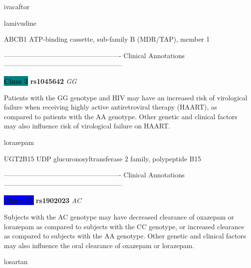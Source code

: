 \documentclass{resume} %
\begin{document}
\begin{rSection}{ ivacaftor }
\end{rSection}\begin{rSection}{ lamivudine }
\item[]

\begin{rSubsection}{ ABCB1 }{ ATP-binding cassette, sub-family B (MDR/TAP), member 1 }{}{}
\item[]

\item[] ---------------------------------------------------- Clinical Annotations -----------------------------------------------------\newline
\item \textbf{\colorbox{teal} {Class 3}} \textbf{ rs1045642 } \textit{ GG }
\item[] Patients with the GG genotype and HIV may have an increased risk of virological failure when receiving highly active antiretroviral therapy (HAART), as compared to patients with the AA genotype. Other genetic and clinical factors may also influence risk of virological failure on HAART.
\end{rSubsection}

\end{rSection}\begin{rSection}{ lorazepam }
\item[]

\begin{rSubsection}{ UGT2B15 }{ UDP glucuronosyltransferase 2 family, polypeptide B15 }{}{}
\item[]

\item[] ---------------------------------------------------- Clinical Annotations -----------------------------------------------------\newline
\item \textbf{\colorbox{blue} {Class 2B}} \textbf{ rs1902023 } \textit{ AC }
\item[] Subjects with the AC genotype may have decreased clearance of oxazepam or lorazepam as compared to subjects with the CC genotype, or increased clearance as compared to subjects with the AA genotype. Other genetic and clinical factors may also influence the oral clearance of oxazepam or lorazepam.
\end{rSubsection}

\end{rSection}\begin{rSection}{ losartan }
\item[]


\end{rSection}
\end{document}
